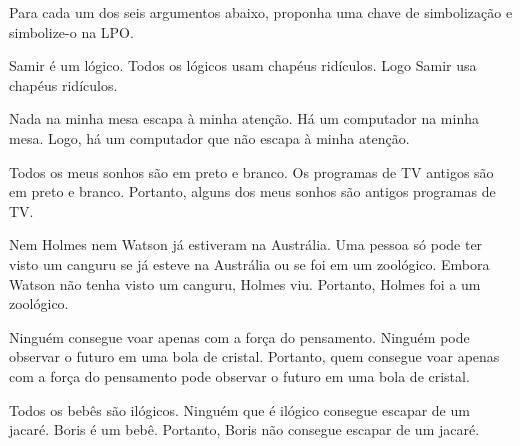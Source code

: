 \problempart
\label{pr.FOLarguments}
Para cada um dos seis argumentos abaixo, proponha uma chave de simbolização e simbolize-o na LPO.
\begin{earg}
\item Samir é um lógico. Todos os lógicos usam chapéus ridículos. Logo Samir usa chapéus ridículos.

\item Nada na minha mesa escapa à minha atenção. Há um computador na minha mesa. Logo, há um computador que não escapa à minha atenção.

\item Todos os meus sonhos são em preto e branco. Os programas de TV antigos são em preto e branco. Portanto, alguns dos meus sonhos são antigos programas de TV.

\item Nem Holmes nem Watson já estiveram na Austrália. Uma pessoa só pode ter visto um canguru se já esteve na Austrália ou se foi em um zoológico. Embora Watson não tenha visto um canguru, Holmes viu. Portanto, Holmes foi a um zoológico.

\item Ninguém consegue voar apenas com a força do pensamento. Ninguém pode observar o futuro em uma bola de cristal. Portanto, quem consegue voar apenas com a força do pensamento pode observar o futuro em uma bola de cristal.

\item Todos os bebês são ilógicos. Ninguém que é ilógico consegue escapar de um jacaré. Boris é um bebê. Portanto, Boris não consegue escapar de um jacaré.

\end{earg}



